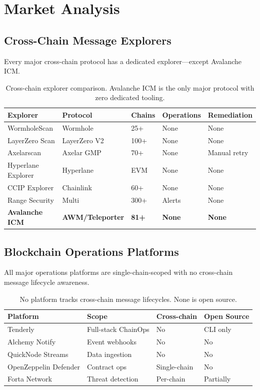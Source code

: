 \documentclass[11pt,a4paper]{article}
\begin{document}
\section{Market Analysis}

\subsection{Cross-Chain Message Explorers}

Every major cross-chain protocol has a dedicated explorer---except Avalanche ICM.

\begin{table}[h]
\centering
\small
\begin{tabularx}{\textwidth}{@{}l l C{1.5cm} C{2cm} C{2.5cm}@{}}
\toprule
\textbf{Explorer} & \textbf{Protocol} & \textbf{Chains} & \textbf{Operations} & \textbf{Remediation} \\
\midrule
WormholeScan & Wormhole & 25+ & None & None \\
LayerZero Scan & LayerZero V2 & 100+ & None & None \\
Axelarscan & Axelar GMP & 70+ & None & Manual retry \\
Hyperlane Explorer & Hyperlane & EVM & None & None \\
CCIP Explorer & Chainlink & 60+ & None & None \\
Range Security & Multi & 300+ & Alerts & None \\
\textbf{Avalanche ICM} & \textbf{AWM/Teleporter} & \textbf{81+} & \textbf{None} & \textbf{None} \\
\bottomrule
\end{tabularx}
\caption{Cross-chain explorer comparison. Avalanche ICM is the only major protocol with zero dedicated tooling.}
\end{table}

\subsection{Blockchain Operations Platforms}

All major operations platforms are single-chain-scoped with no cross-chain message lifecycle awareness.

\begin{table}[h]
\centering
\small
\begin{tabularx}{\textwidth}{@{}l L{5cm} C{2cm} C{2cm}@{}}
\toprule
\textbf{Platform} & \textbf{Scope} & \textbf{Cross-chain} & \textbf{Open Source} \\
\midrule
Tenderly & Full-stack ChainOps & No & CLI only \\
Alchemy Notify & Event webhooks & No & No \\
QuickNode Streams & Data ingestion & No & No \\
OpenZeppelin Defender & Contract ops & Single-chain & No \\
Forta Network & Threat detection & Per-chain & Partially \\
\bottomrule
\end{tabularx}
\caption{No platform tracks cross-chain message lifecycles. None is open source.}
\end{table}
\end{document}
